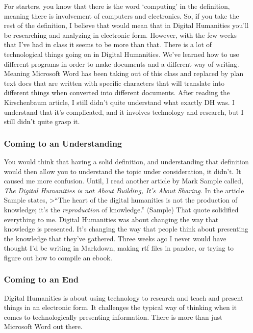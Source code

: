 \documentclass[]{article}
\begin{document}
For starters, you know that there is the word `computing' in the
definition, meaning there is involvement of computers and electronics.
So, if you take the rest of the definition, I believe that would mean
that in Digital Humanities you'll be researching and analyzing in
electronic form. However, with the few weeks that I've had in class it
seems to be more than that. There is a lot of technological things going
on in Digital Humanities. We've learned how to use different programs in
order to make documents and a different way of writing. Meaning
Microsoft Word has been taking out of this class and replaced by plan
text docs that are written with specific characters that will translate
into different things when converted into different documents. After
reading the Kirschenbaum article, I still didn't quite understand what
exactly DH was. I understand that it's complicated, and it involves
technology and research, but I still didn't quite grasp it.

\subsubsection{Coming to an
Understanding}\label{coming-to-an-understanding}

You would think that having a solid definition, and understanding that
definition would then allow you to understand the topic under
consideration, it didn't. It caused me more confusion. Until, I read
another article by Mark Sample called, \emph{The Digital Humanities is
not About Building, It's About Sharing.} In the article Sample states,
\textgreater{}``The heart of the digital humanities is not the
production of knowledge; it's the \emph{reproduction} of knowledge.''
(Sample) That quote solidified everything to me. Digital Humanities was
about changing the way that knowledge is presented. It's changing the
way that people think about presenting the knowledge that they've
gathered. Three weeks ago I never would have thought I'd be writing in
Markdown, making rtf files in pandoc, or trying to figure out how to
compile an ebook.

\subsubsection{Coming to an End}\label{coming-to-an-end}

Digital Humanities is about using technology to research and teach and
present things in an electronic form. It challenges the typical way of
thinking when it comes to technologically presenting information. There
is more than just Microsoft Word out there.
\end{document}
